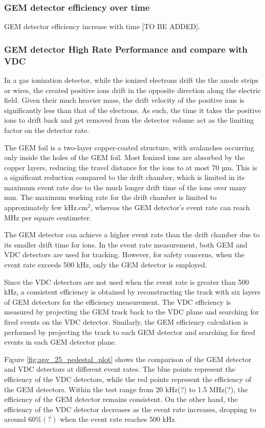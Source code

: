 \subsubsection{GEM detector efficiency over time}

GEM detector efficiency increase with time [TO BE ADDED]. 

%
%
\subsubsection{GEM detector High Rate Performance and compare with VDC}
In a gas ionization detector, while the ionized electrons drift the the anode strips or wires, the created positive ions drift in the opposite direction along the electric field. Given their much heavier mass, the drift velocity of the positive ions is significantly less than that of the electrons. As such, the time it takes the positive ions to drift back and get removed from the detector volume act as the limiting factor on the detector rate. 

The GEM foil is a two-layer copper-coated structure, with avalanches occurring only inside the holes of the GEM foil. Most Ionized ions are absorbed by the copper layers, reducing the travel distance  for the ions to at most 70 µm. This is a significant reduction compared to the drift chamber, which is limited in its maximum event rate due to the much longer drift time of the ions over many mm. The maximum working rate for the drift chamber is limited to approximately few kHz.cm$^2$, whereas the GEM detector's event rate can reach MHz per square centimeter. 

The GEM detector can achieve a higher event rate than the drift chamber due to its smaller drift time for ions. In the event rate measurement, both GEM and VDC detectors are used for tracking. However, for safety concerns, when the event rate exceeds 500 kHz, only the GEM detector is employed.

Since the VDC detectors are  not used when the event rate is greater than 500 kHz, a consistent efficiency is obtained by reconstructing the track with six layers of GEM detectors for the efficiency measurement. The VDC efficiency is measured by projecting the GEM track back to the VDC plane and searching for fired events on the VDC detector. Similarly, the GEM efficiency calculation is performed by projecting the track to each GEM detector and searching for fired events in each GEM detector plane.

Figure \ref{fig:apv_25_pedestal_plot} shows the comparison of the GEM detector and VDC detectors at different event rates. The blue points represent the efficiency of the VDC detectors, while the red points represent the efficiency of the GEM detectors. Within the test range from 20 kHz(?) to 1.5 MHz(?), the efficiency of the GEM detector remains consistent. On the other hand, the efficiency of the VDC detector decreases as the event rate increases, dropping to around $60\%(?)$ when the event rate reaches 500 kHz. 

